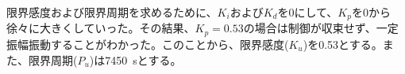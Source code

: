 \documentclass[a4j]{ujarticle}
\begin{document}
限界感度および限界周期を求めるために、$K_i$および$K_d$を0にして、$K_p$を0から徐々に大きくしていった。その結果、$K_p=0.53$の場合は制御が収束せず、一定振幅振動することがわかった。このことから、限界感度($K_u$)を0.53とする。また、限界周期($P_u$)は7450~sとする。
\end{document}
